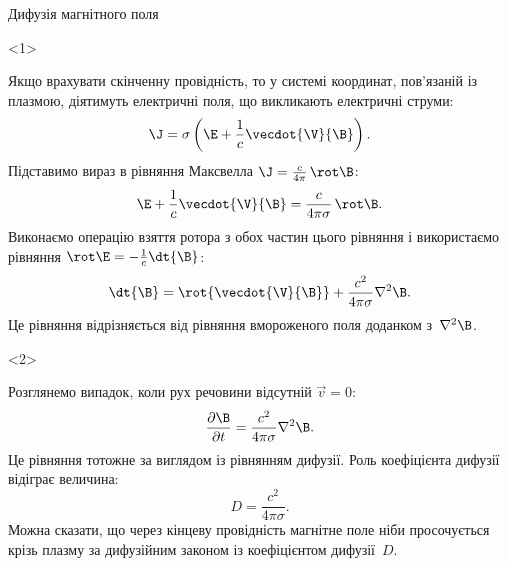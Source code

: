 \documentclass[]{beamer}
\begin{document}
\begin{frame}{Дифузія магнітного поля}{}
	\begin{onlyenv}
		\begin{block}{}
			Якщо врахувати скінченну провідність, то у системі координат, пов'язаній із плазмою, діятимуть електричні поля, що викликають електричні струми:
			\begin{equation*}
				\J = \sigma\left(\E  + \frac1c \vecdot{\V}{\B}\right).
			\end{equation*}
			Підставимо вираз в рівняння Максвелла \(\J = \frac{c}{4\pi}\, \rot\B\):
			\begin{equation*}
				\E  + \frac1c\vecdot{\V}{\B} = \frac{c}{4\pi\sigma}\, \rot\B.
			\end{equation*}
			Виконаємо операцію  взяття ротора з обох частин цього рівняння і використаємо рівняння \( \rot\E = - \frac1c\dt{\B}\):
			\begin{equation*}
				\dt{\B} = \rot{\vecdot{\V}{\B}} + \frac{c^2}{4\pi\sigma}\nabla^2\B.
			\end{equation*}
			Це рівняння відрізняється від рівняння вмороженого поля доданком з~$\nabla^2\B$.
		\end{block}
	\end{onlyenv}
	\begin{onlyenv}
		\begin{block}{}\justifying
			Розглянемо випадок, коли рух речовини відсутній $\vec{v} = 0$:
			\begin{equation*}
				\frac{\partial \B}{\partial t} = \frac{c^2}{4\pi\sigma}\nabla^2\B.
			\end{equation*}
			Це рівняння тотожне за виглядом із рівнянням дифузії. Роль коефіцієнта дифузії відіграє величина:
			\begin{equation*}
				D = \frac{c^2}{4\pi\sigma}.
			\end{equation*}
			Можна сказати, що через кінцеву провідність магнітне поле ніби просочується крізь плазму за дифузійним
			законом із коефіцієнтом дифузії~$D$.


\end{block}
\end{onlyenv}
\end{frame}
\end{document}

